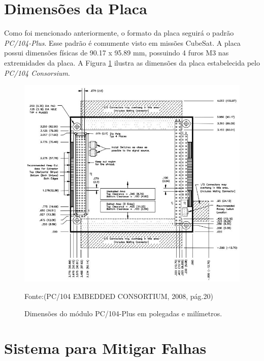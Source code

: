 

\section{Dimensões da Placa}

Como foi mencionado anteriormente, o formato da placa seguirá o padrão \textit{PC/104-Plus}. Esse padrão é comumente visto em missões CubeSat. A placa possui dimensões físicas de 90.17 x 95.89 mm, possuindo 4 furos M3 nas extremidades da placa. A Figura \ref{pc104} ilustra as dimensões da placa estabelecida pelo \textit{PC/104 Consorsium}.

\begin{figure}[h]
	\centering
	\caption{Dimensões do módulo PC/104-Plus em polegadas e milímetros.}
	
	\includegraphics[keepaspectratio=true,scale=0.7]{figuras/pc104_32bit.PNG}
	
	Fonte:(PC/104 EMBEDDED CONSORTIUM, 2008, pág.20)
	
	\label{pc104}
\end{figure}

\section{Sistema para Mitigar Falhas}

